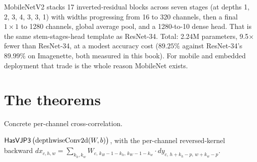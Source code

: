 
MobileNetV2 stacks 17 inverted-residual blocks across seven stages
(at depths 1, 2, 3, 4, 3, 3, 1) with widths progressing from 16 to
320 channels, then a final \(1 \times 1\) to 1280 channels, global
average pool, and a 1280-to-10 dense head. That is the same
stem-stages-head template as ResNet-34. Total: 2.24M parameters,
9.5$\times$ fewer than ResNet-34, at a modest accuracy cost
($89.25\%$ against ResNet-34's $89.99\%$ on Imagenette, both
measured in this book). For mobile and embedded deployment that
trade is the whole reason MobileNet exists.

\section{The theorems}



\begin{definition}
  \label{ax:depthwiseConv2d}
  \leanok
  Concrete per-channel cross-correlation.
\end{definition}

\begin{theorem}
  \label{ax:depthwiseHasVJP3}
  \leanok
  \Prove{} \(\mathsf{HasVJP3}\, \bigl(\mathrm{depthwiseConv2d}(W, b)\bigr)\),
  with the per-channel reversed-kernel backward
  \(dx_{c, h, w} = \sum_{k_h, k_w}
    W_{c,\, k_H - 1 - k_h,\, k_W - 1 - k_w} \cdot
    dy_{c,\, h + k_h - p,\, w + k_w - p}\).
\end{theorem}

